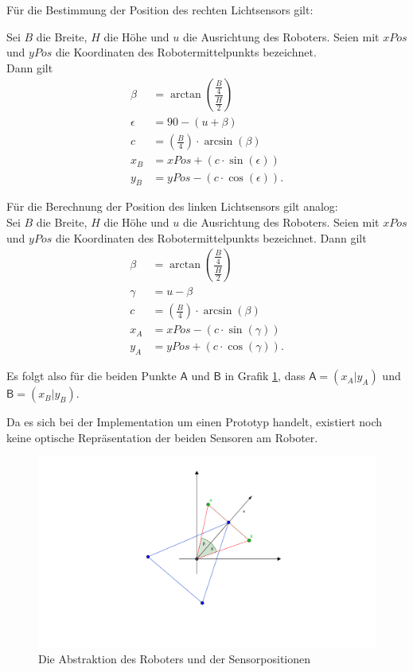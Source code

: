 \documentclass[paper=a4, DIV=calc, BCOR=12mm, twoside=on, onecolumn=on, open = right, titlepage =on, parskip =half-, headsepline = on, footsepline = off, chapterprefix = off, appendixprefix = on, fontsize = 12pt, numbers = noenddot, abstract = on]{scrbook}
\begin{document}
Für die Bestimmung der Position des rechten Lichtsensors gilt:

Sei $B$ die Breite, $H$ die Höhe und $u$ die Ausrichtung des Roboters. Seien mit $xPos$ und $yPos$ die Koordinaten des Robotermittelpunkts bezeichnet.\\
Dann gilt
\renewcommand\arraystretch{3}
\begin{align*}
\beta & = \arctan \left( \dfrac{\frac{B}{4}}{\frac{H}{2}} \right)\\
\epsilon & = 90 - (u + \beta)\\
c & = \left( \frac{B}{4} \right) \cdot \arcsin (\beta)\\
x_B & = xPos + \left( c \cdot \sin(\epsilon) \right)\\
y_B & = yPos - \left( c \cdot \cos(\epsilon) \right).
\end{align*}

Für die Berechnung der Position des linken Lichtsensors gilt analog:\\
Sei $B$ die Breite, $H$ die Höhe und $u$ die Ausrichtung des Roboters. Seien mit $xPos$ und $yPos$ die Koordinaten des Robotermittelpunkts bezeichnet. Dann gilt
\renewcommand\arraystretch{3}
\begin{align*}
\beta & = \arctan \left( \dfrac{\frac{B}{4}}{\frac{H}{2}} \right)\\
\gamma & = u - \beta\\
c & = \left( \frac{B}{4} \right) \cdot \arcsin (\beta)\\
x_A & = xPos - \left( c \cdot \sin(\gamma) \right)\\
y_A & = yPos + \left( c \cdot \cos(\gamma) \right).
\end{align*}

Es folgt also für die beiden Punkte $\mathsf{A}$ und $\mathsf{B}$ in Grafik \ref{fig:roboter_abstrakt}, dass $\mathsf{A} = \left( x_A \vert y_A \right)$ und $\mathsf{B} = \left( x_B \vert y_B \right)$.


Da es sich bei der Implementation um einen Prototyp handelt, existiert noch keine optische Repräsentation der beiden Sensoren am Roboter. 

\begin{figure}[htbp]
\centering
\hspace*{-6em}\includegraphics[scale=1.1]{images/lichtsensorgrafik.png} 
\caption{Die Abstraktion des Roboters und der Sensorpositionen}
\label{fig:roboter_abstrakt}
\end{figure}
\end{document}
